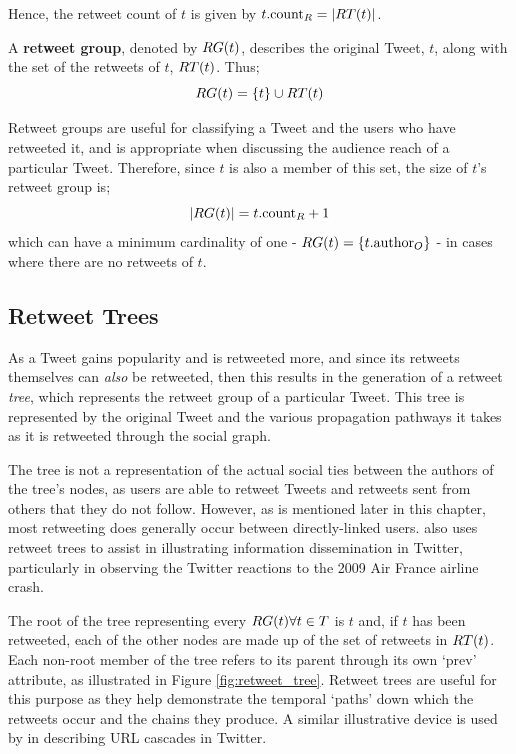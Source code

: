 Hence, the retweet count of $t$ is given by $ t.\textrm{count}_R = \left\vert{RT(t)}\right\vert $.


\begin{mydefinition}
\label{definition:retweet_group}
A \textbf{retweet group}, denoted by $RG(t)$, describes the original Tweet, $t$, along with the set of the retweets of $t$, $RT(t)$. Thus;
\[
    RG(t) = \left\{t\right\} \cup RT(t)
\]
\end{mydefinition}


Retweet groups are useful for classifying a Tweet and the users who have retweeted it, and is appropriate when discussing the audience reach of a particular Tweet. Therefore, since $t$ is also a member of this set, the size of $t$'s retweet group is; 
\[
	\left\vert{
RG(t)}\right\vert = t.\textrm{count}_R + 1 
\] 
which can have a minimum cardinality of one - $RG(t) = \left\{t.\textrm{author}_O\right\}$ - in cases where there are no retweets of $t$.
 

\subsection{Retweet Trees}
As a Tweet gains popularity and is retweeted more, and since its retweets themselves can \textit{also} be retweeted, then this results in the generation of a retweet \textit{tree}, which represents the retweet group of a particular Tweet. This tree is represented by the original Tweet and the various propagation pathways it takes as it is retweeted through the social graph. 

The tree is not a representation of the actual social ties between the authors of the tree's nodes, as users are able to retweet Tweets and retweets sent from others that they do not follow. However, as is mentioned later in this chapter, most retweeting does generally occur between directly-linked users. \cite{kwak10} also uses retweet trees to assist in illustrating information dissemination in Twitter, particularly in observing the Twitter reactions to the 2009 Air France airline crash.

The root of the tree representing every $RG(t) \forall t \in T$ is $t$ and, if $t$ has been retweeted, each of the other nodes are made up of the set of retweets in $RT(t)$. Each non-root member of the tree refers to its parent through its own `$\textrm{prev}$' attribute, as illustrated in Figure \ref{fig:retweet_tree}. Retweet trees are useful for this purpose as they help demonstrate the temporal `paths' down which the retweets occur and the chains they produce. A similar illustrative device is used by \cite{galuba10} in describing URL cascades in Twitter.

